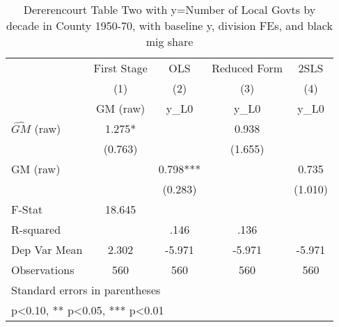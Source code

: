 \begin{table}[htbp]\centering
\def\sym#1{\ifmmode^{#1}\else\(^{#1}\)\fi}
\caption{Dererencourt Table Two with y=Number of Local Govts by decade in County 1950-70, with baseline y, division FEs, and black mig share}
\begin{tabular}{l*{4}{c}}
\toprule
                    & First Stage   &         OLS   &Reduced Form   &        2SLS   \\
                    &\multicolumn{1}{c}{(1)}&\multicolumn{1}{c}{(2)}&\multicolumn{1}{c}{(3)}&\multicolumn{1}{c}{(4)}\\
                    &\multicolumn{1}{c}{GM  (raw)}&\multicolumn{1}{c}{y\_L0}&\multicolumn{1}{c}{y\_L0}&\multicolumn{1}{c}{y\_L0}\\
\midrule
$\hat{GM}$ (raw)    &       1.275*  &               &       0.938   &               \\
                    &     (0.763)   &               &     (1.655)   &               \\
\addlinespace
GM  (raw)           &               &       0.798***&               &       0.735   \\
                    &               &     (0.283)   &               &     (1.010)   \\
\midrule
F-Stat              &      18.645   &               &               &               \\
R-squared           &               &        .146   &        .136   &               \\
Dep Var Mean        &       2.302   &      -5.971   &      -5.971   &      -5.971   \\
Observations        &         560   &         560   &         560   &         560   \\
\bottomrule
\multicolumn{5}{l}{\footnotesize Standard errors in parentheses}\\
\multicolumn{5}{l}{\footnotesize * p<0.10, ** p<0.05, *** p<0.01}\\
\end{tabular}
\end{table}

